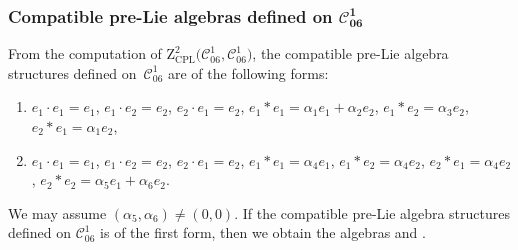 \documentclass[pdftex]{sigma}
\numberwithin{equation}{section}
\begin{document}
\subsubsection[Compatible pre-Lie algebras defined on C\_\{06\}\^{}1]{Compatible pre-Lie algebras defined on $\boldsymbol{\mathcal{C}_{06}^{1}}$}

From the computation of $\mathrm{Z}_{\mathrm{CPL}}^{2}\bigl(\mathcal{C}_{06}^{1},%
\mathcal{C}_{06}^{1}\bigr)$, the compatible pre-Lie algebra structures defined on~$\mathcal{C}_{06}^{1}$ are of the following forms:
\begin{enumerate}\itemsep=0pt
\item[(1)] $e_{1}\cdot e_{1}=e_{1}$, $e_{1}\cdot e_{2}=e_{2}$, $e_{2}\cdot
e_{1}=e_{2}$,
$e_{1}\ast e_{1}=\alpha _{1}e_{1}+\alpha _{2}e_{2}$, $e_{1}\ast
e_{2}=\alpha _{3}e_{2}$, $e_{2}\ast e_{1}=\alpha _{1}e_{2}$,

\item[(2)] $e_{1}\cdot e_{1}=e_{1}$, $e_{1}\cdot e_{2}=e_{2}$, $e_{2}\cdot
e_{1}=e_{2}$,
$e_{1}\ast e_{1}=\alpha _{4}e_{1}$, $e_{1}\ast e_{2}=\alpha _{4}e_{2}$, $%
e_{2}\ast e_{1}=\alpha _{4}e_{2}$, $e_{2}\ast e_{2}=\alpha
_{5}e_{1}+\alpha _{6}e_{2}$.
\end{enumerate}

We may assume $( \alpha _{5},\alpha _{6}) \neq ( 0,0) $.
If the compatible pre-Lie algebra structures defined on $\mathcal{C}%
_{06}^{1}$ is of the first form, then we obtain the algebras  and .
\end{document}

